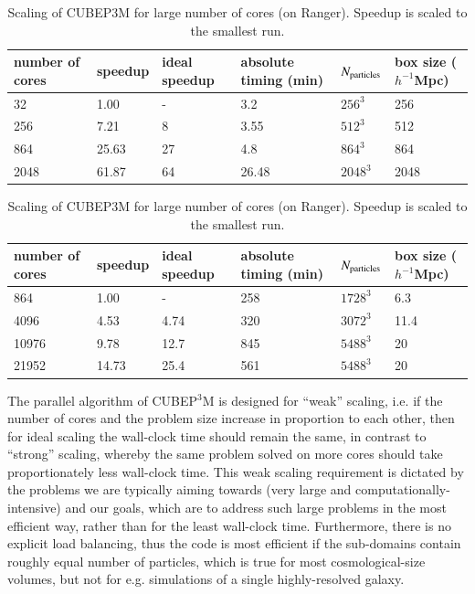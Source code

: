 \begin{table}%
  \vskip -0.5cm 
  \begin{center}
\caption{Scaling of {\small CUBEP3M} on Curie. Speedup is 
scaled to the smallest run.}
\label{summary_scaling_table}
\begin{tabular}{@{}|llllll|}
\hline
number of cores & speedup & ideal speedup & absolute timing (min) & 
$N_{\rm particles}$& box size ($h^{-1}$Mpc)
\\[2mm]\hline
32  &  1.00 & - &3.2 & $256^3$ & 256\\
256  & 7.21 & 8 &3.55 & $512^3$  & 512\\
864  & 25.63 & 27 &4.8 & $864^3$  & 864\\
2048  & 61.87 & 64 &26.48 & $2048^3$ & 2048 \\
\hline
\end{tabular}
\caption{Scaling of  {\small CUBEP3M} for large number of cores 
(on Ranger). Speedup is scaled to the smallest run.}
\label{summary_scaling_table2}
\begin{tabular}{@{}|llllll|}
\hline
number of cores & speedup & ideal speedup & absolute timing (min) & 
$N_{\rm particles}$& box size ($h^{-1}$Mpc)
\\[2mm]\hline
864    & 1.00  & -    &258   & $1728^3$  & 6.3\\
4096   & 4.53  & 4.74 &320   & $3072^3$  & 11.4\\
10976  & 9.78  & 12.7 &845   & $5488^3$  & 20\\
21952  & 14.73 & 25.4 &561   & $5488^3$  & 20 \\
\hline
\end{tabular}
\end{center}
  \vskip -0.7cm 
\end{table}


The parallel algorithm of {\small CUBEP$^3$M} is designed for ``weak'' 
scaling, i.e. if the number of cores and the problem size 
increase in proportion to each other, then for ideal scaling the 
wall-clock time should remain the same, in contrast to ``strong'' 
scaling, whereby the same problem solved on more cores should take 
proportionately less wall-clock time. This weak scaling requirement 
is dictated by the problems we are typically aiming towards (very 
large and computationally-intensive) and our goals, which are to 
address such large problems in the most efficient way, rather than 
for the least wall-clock time. Furthermore, there is no explicit 
load balancing, thus the code is most efficient if the sub-domains
contain roughly equal number of particles, which is true for most
cosmological-size volumes, but not for e.g. simulations of a single
highly-resolved galaxy. 

